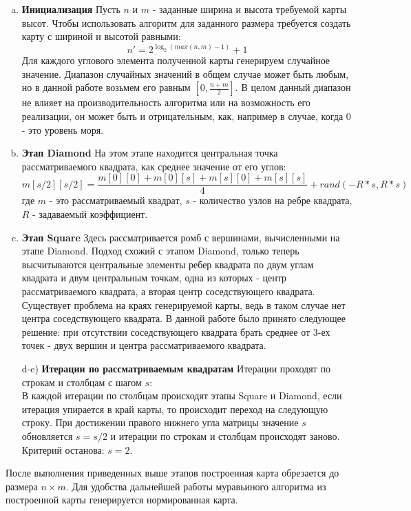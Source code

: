 \documentclass{article}
\numberwithin{equation}{section}
\begin{document}
			\begin{enumerate}[a)]
				\item \textbf{Инициализация}
					Пусть $n$ и $m$ - заданные ширина и высота требуемой карты высот. Чтобы использовать алгоритм для заданного размера требуется создать карту с шириной и высотой равными:
					\[ n' = 2^{\log_2 (max(n,m) - 1)} + 1 \]
					Для каждого углового элемента полученной карты генерируем случайное значение. Диапазон случайных значений в общем случае может быть любым, но в данной работе возьмем его равным $[0, \frac{n + m}{2}]$. В целом данный диапазон не влияет на производительность алгоритма или на возможность его реализации, он может быть и отрицательным, как, например в случае, когда 0 - это уровень моря.
				\item \textbf{Этап Diamond}
					На этом этапе находится центральная точка рассматриваемого квадрата, как среднее значение от его углов:
					\[ m[s/2][s/2] = \frac{m[0][0] + m[0][s] + m[s][0] + m[s][s]}{4} + rand(-R * s, R * s) \]
					где $m$ - это рассматриваемый квадрат, $s$ - количество узлов на ребре квадрата, $R$ - задаваемый коэффициент.
				\item \textbf{Этап Square}
					Здесь рассматривается ромб с вершинами, вычисленными на этапе Diamond. Подход схожий с этапом Diamond, только теперь высчитываются центральные элементы ребер квадрата по двум углам квадрата и двум центральным точкам, одна из которых - центр рассматриваемого квадрата, а вторая центр соседствующего квадрата. Существует проблема на краях генерируемой карты, ведь в таком случае нет центра соседствующего квадрата. В данной работе было принято следующее решение: при отсутствии соседствующего квадрата брать среднее от 3-ех точек - двух вершин и центра рассматриваемого квадрата.
				\item[d-e)] \textbf{Итерации по рассматриваемым квадратам}
					Итерации проходят по строкам и столбцам с шагом $s$:\\
					В каждой итерации по столбцам происходят этапы Square и Diamond, если итерация упирается в край карты, то происходит переход на следующую строку. При достижении правого нижнего угла матрицы значение $s$ обновляется $s = s / 2$ и итерации по строкам и столбцам происходят заново.\\
					Критерий останова: $s = 2$.
			\end{enumerate}

			После выполнения приведенных выше этапов построенная карта обрезается до размера $n \times m$. Для удобства дальнейшей работы муравьиного алгоритма из построенной карты генерируется нормированная карта.
\end{document}
